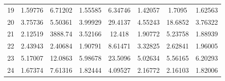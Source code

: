 \begin{center}
\begin{longtable}{cccccccc}
19 & 1.59776 & 6.71202 & 1.55585 & 6.34746 & 1.42057 & 1.7095 & 1.62563\\
20 & 3.75736 & 5.50361 & 3.99929 & 29.4137 & 4.55243 & 18.6852 & 3.76322\\
21 & 2.12519 & 3888.74 & 3.52166 & 12.418 & 1.90772 & 5.23758 & 1.88939\\
22 & 2.43943 & 2.40684 & 1.90791 & 8.61471 & 3.32825 & 2.62841 & 1.96005\\
23 & 5.17007 & 12.0863 & 5.98678 & 23.5096 & 5.02634 & 5.56165 & 6.20293\\
24 & 1.67374 & 7.61316 & 1.82444 & 4.09527 & 2.16772 & 2.16103 & 1.82006\\
\end{longtable}
\end{center} 


